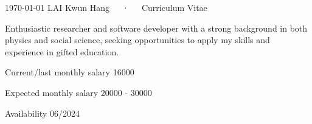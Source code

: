 \documentclass[11pt, a4paper]{awesome-cv}
\begin{document}
\makecvheader

\makecvfooter
  {\today}
  {LAI Kwun Hang~~~·~~~Curriculum Vitae}
  {\thepage}

\vspace{1em}
Enthusiastic researcher and software developer with a strong background in both physics and social science, seeking opportunities to apply my skills and experience in gifted education.







%

%
%
%
%



\begin{cvskills}

  \cvskill
    {Current/last monthly salary} %
    {16000} %

  \cvskill
    {Expected monthly salary} %
    {20000 - 30000} %

  \cvskill
    {Availability} %
    {06/2024} %

\end{cvskills}



\end{document}
